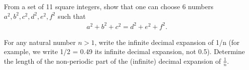 \item From a set of 11 square integers, show that one can choose 6 numbers $a^{2}, b^{2}, c^{2}, d^{2}, e^{2}, f^{2}$ such that
\begin{align*}
 a^{2}+b^{2}+c^{2} = d^{2}+e^{2}+f^{2}.
\end{align*}

\item For any natural number $n > 1$, write the infinite decimal expansion of 1/n (for example, we write 1/2 = 0.49 its infinite decimal expansion, not 0.5). Determine the length of the non-periodic part of the (infinite) decimal expansion of $\frac{1}{n}$.













